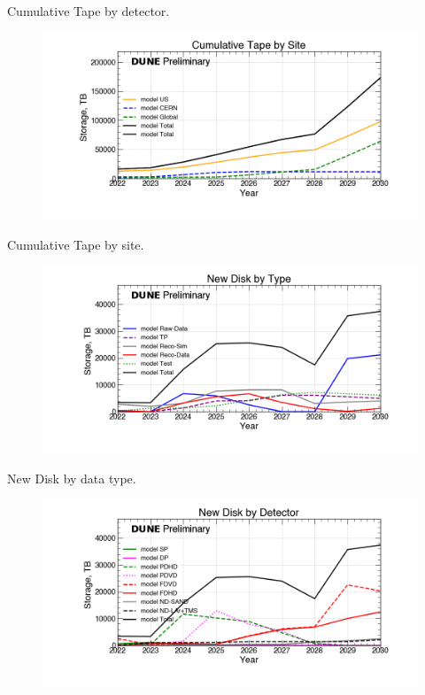 \begin{table}[h]
\label{tab:TapeByYearByType}
\caption{Cumulative Tape by detector.}
\end{table}
\pagebreak
\begin{figure}[ht]
\centering\includegraphics[height=0.4\textwidth]{NearTerm_2024-08-14-2030_noMWC_Cumulative-Tape-by-Site-Storage.png}\end{figure}
\begin{table}[h]
\label{tab:TapeByYearByType}
\caption{Cumulative Tape by site.}
\end{table}
\pagebreak
\begin{figure}[ht]
\centering\includegraphics[height=0.4\textwidth]{NearTerm_2024-08-14-2030_noMWC_New-Disk-by-Type-Storage.png}\end{figure}
\begin{table}[h]
\label{tab:DiskByYearByType}
\caption{New Disk by data type.}
\end{table}
\pagebreak
\begin{figure}[ht]
\centering\includegraphics[height=0.4\textwidth]{NearTerm_2024-08-14-2030_noMWC_New-Disk-by-Detector-Storage.png}\end{figure}
